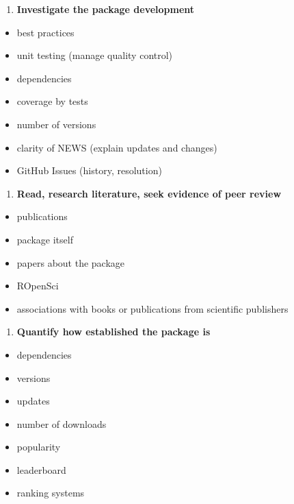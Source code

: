\documentclass[10pt,letterpaper]{article}
\providecommand{\tightlist}{%
  \setlength{\itemsep}{0pt}\setlength{\parskip}{0pt}}
\begin{document}
\begin{enumerate}
\def\labelenumi{\arabic{enumi}.}
\setcounter{enumi}{5}
\tightlist
\item
  \textbf{Investigate the package development}
\end{enumerate}

\begin{itemize}
\tightlist
\item
  best practices
\item
  unit testing (manage quality control)
\item
  dependencies
\item
  coverage by tests
\item
  number of versions
\item
  clarity of NEWS (explain updates and changes)
\item
  GitHub Issues (history, resolution)
\end{itemize}

\begin{enumerate}
\def\labelenumi{\arabic{enumi}.}
\setcounter{enumi}{6}
\tightlist
\item
  \textbf{Read, research literature, seek evidence of peer review}
\end{enumerate}

\begin{itemize}
\tightlist
\item
  publications
\item
  package itself
\item
  papers about the package
\item
  ROpenSci
\item
  associations with books or publications from scientific publishers
\end{itemize}

\begin{enumerate}
\def\labelenumi{\arabic{enumi}.}
\setcounter{enumi}{7}
\tightlist
\item
  \textbf{Quantify how established the package is}
\end{enumerate}

\begin{itemize}
\tightlist
\item
  dependencies
\item
  versions
\item
  updates
\item
  number of downloads
\item
  popularity
\item
  leaderboard
\item
  ranking systems
\end{itemize}
\end{document}
